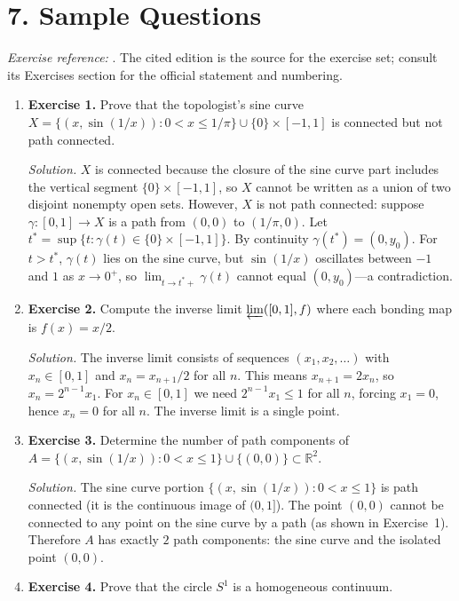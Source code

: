 \section*{7. Sample Questions}
\emph{Exercise reference:} \cite{continuum_theory_ref1}. The cited edition is the source for the exercise set; consult its Exercises section for the official statement and numbering.
\begin{enumerate}[leftmargin=*,itemsep=0.9em]

\item \textbf{Exercise 1.} Prove that the topologist's sine curve $X=\{(x,\sin(1/x)):0<x\leq1/\pi\}\cup\{0\}\times[-1,1]$ is connected but not path connected.

\emph{Solution.} $X$ is connected because the closure of the sine curve part includes the vertical segment $\{0\}\times[-1,1]$, so $X$ cannot be written as a union of two disjoint nonempty open sets. However, $X$ is not path connected: suppose $\gamma:[0,1]\to X$ is a path from $(0,0)$ to $(1/\pi,0)$. Let $t^*=\sup\{t:\gamma(t)\in\{0\}\times[-1,1]\}$. By continuity $\gamma(t^*)=(0,y_0)$. For $t>t^*$, $\gamma(t)$ lies on the sine curve, but $\sin(1/x)$ oscillates between $-1$ and $1$ as $x\to 0^+$, so $\lim_{t\to t^*+}\gamma(t)$ cannot equal $(0,y_0)$---a contradiction.

\item \textbf{Exercise 2.} Compute the inverse limit $\varprojlim([0,1],f)$ where each bonding map is $f(x)=x/2$.

\emph{Solution.} The inverse limit consists of sequences $(x_1,x_2,\ldots)$ with $x_n\in[0,1]$ and $x_n=x_{n+1}/2$ for all $n$. This means $x_{n+1}=2x_n$, so $x_n=2^{n-1}x_1$. For $x_n\in[0,1]$ we need $2^{n-1}x_1\leq1$ for all $n$, forcing $x_1=0$, hence $x_n=0$ for all $n$. The inverse limit is a single point.

\item \textbf{Exercise 3.} Determine the number of path components of $A=\{(x,\sin(1/x)):0<x\leq1\}\cup\{(0,0)\}\subset\mathbb{R}^2$.

\emph{Solution.} The sine curve portion $\{(x,\sin(1/x)):0<x\leq 1\}$ is path connected (it is the continuous image of $(0,1]$). The point $(0,0)$ cannot be connected to any point on the sine curve by a path (as shown in Exercise~1). Therefore $A$ has exactly $2$ path components: the sine curve and the isolated point $(0,0)$.

\item \textbf{Exercise 4.} Prove that the circle $S^1$ is a homogeneous continuum.


\end{enumerate}
